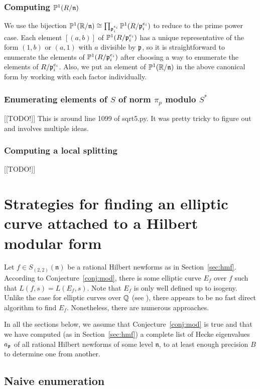 \documentclass{amsart}
\newcommand{\n}{\mathfrak{n}}
\begin{document}
\subsubsection{Computing $\P^1(R/\n)$}
We use the bijection $\P^1(\R/\n) \isom \prod_{\p_i^{e_i}}
\P^1(R/\p_i^{e_i})$ to reduce to the prime power case.  Each element
$[(a,b)]$ of $\mathbb{P}^1(R/\mathfrak{p}_i^{e_i})$ has a unique representative of the
form $(1,b)$ or $(a,1)$ with $a$ divisible by $\mathfrak{p}$, so it is straightforward
to enumerate the elements of $\mathbb{P}^1(R/\mathfrak{p}_i^{e_i})$ after choosing a way
to enumerate the elements of $R/\mathfrak{p}_i^{e_i}$.  Also, we put an element
of $\P^1(\R/\n)$ in the above canonical form by working with each factor
individually. 


\subsubsection{Enumerating elements of $S$ of norm $\pi_p$ modulo $S^*$}
[[TODO!]]
This is around line 1099 of sqrt5.py.  It was pretty tricky to figure out
and involves multiple ideas.

\subsubsection{Computing a local splitting}
[[TODO!]]



\section{Strategies for finding an elliptic curve attached to a Hilbert modular form}
Let $f\in S_{(2,2)}(\n)$ be a rational Hilbert newforms as in
Section~\ref{sec:hmf}.  According to Conjecture~\ref{conj:mod}, there
is some elliptic curve $E_f$ over $f$ such that $L(f,s) = L(E_f,s)$.
Note that $E_f$ is only well defined up to isogeny.  Unlike the case
for elliptic curves over $\mathbb{Q}$ (see \cite{cremona:algs}), there appears
to be no fast direct algorithm to find $E_f$.  Nonetheless, there are
numerous approaches.

In all the sections below, we assume that Conjecture~\ref{conj:mod} is
true and that we have computed (as in Section~\ref{sec:hmf}) a
complete list of Hecke eigenvalues $a_{\mathfrak{p}}$ of all rational Hilbert
newforms of some level $\n$, to at least enough precision $B$ to determine
one from another.

\subsection{Naive enumeration}\label{sec:naive}
\end{document}
